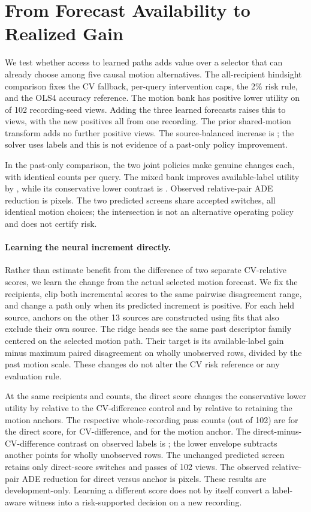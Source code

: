 \section{From Forecast Availability to Realized Gain}
We test whether access to learned paths adds value over a selector
that can already choose among five causal motion alternatives.
The all-recipient hindsight comparison fixes the CV fallback,
per-query intervention caps, the 2\% risk rule, and the OLS4
accuracy reference. The motion bank has positive lower utility on
\CausalPositive{} of 102 recording-seed views. Adding the three
learned forecasts raises this to \MixedPositive{} views, with the
new positives all from one recording. The prior shared-motion
transform adds no further positive views. The source-balanced
increase is \CapacityGain; the solver uses labels and this is
not evidence of a past-only policy improvement.

In the past-only comparison, the two joint policies make
\MenuSwitches{} genuine changes each, with identical counts per
query. The mixed bank improves available-label utility by
\MenuObserved, while its conservative lower contrast is \MenuLower.
Observed relative-pair ADE reduction is \MenuPair{} pixels.
The two predicted screens share \CommonScreenSwitches{} accepted
switches, all identical motion choices; the intersection is not
an alternative operating policy and does not certify risk.

\paragraph{Learning the neural increment directly.}
Rather than estimate benefit from the difference of two separate
CV-relative scores, we learn the change from the actual selected
motion forecast. We fix the recipients, clip both incremental
scores to the same pairwise disagreement range, and change a path
only when its predicted increment is positive. For each held
source, anchors on the other 13 sources are constructed using
fits that also exclude their own source. The ridge heads see
the same past descriptor family centered on the selected
motion path. Their target is its available-label gain minus
maximum paired disagreement on wholly unobserved rows, divided
by the past motion scale. These changes do not alter the CV risk
reference or any evaluation rule.

At the same recipients and counts, the direct score changes the
conservative lower utility by \DirectVsCV{} relative to the
CV-difference control and by \DirectVsAnchor{} relative to
retaining the motion anchors. The respective whole-recording
pass counts (out of 102) are \DirectPass{} for the direct
score, \DifferencePass{} for CV-difference, and \AnchorPass{}
for the motion anchor. The direct-minus-CV-difference contrast
on observed labels is \DirectKnown; the lower envelope subtracts
another \DirectMissing{} points for wholly unobserved rows.
The unchanged predicted screen retains only \DirectScreenSwitches{}
direct-score switches and passes \DirectScreenPass{} of 102 views.
The observed relative-pair ADE reduction
for direct versus anchor is \DirectPair{} pixels. These results
are development-only. Learning a different score does not
by itself convert a label-aware witness into a risk-supported
decision on a new recording.
